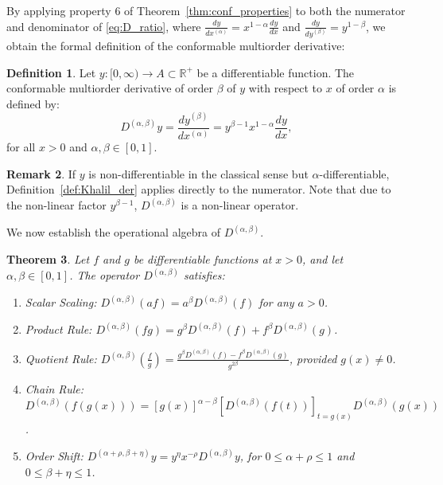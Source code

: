 \documentclass[oneside,10pt]{article}
\theoremstyle{plain}
\newtheorem{theorem}{Theorem}[section]
\theoremstyle{definition}
\newtheorem{definition}[theorem]{Definition}
\newtheorem{remark}[theorem]{Remark}
\begin{document}
By applying property 6 of Theorem~\ref{thm:conf_properties} to both the numerator and denominator of \eqref{eq:D_ratio}, where $\frac{dy}{dx^{(\alpha)}} = x^{1-\alpha} \frac{dy}{dx}$ and $\frac{dy}{dy^{(\beta)}} = y^{1-\beta}$, we obtain the formal definition of the conformable multiorder derivative:

\begin{definition}\label{def:multiorder_der}
Let $y: [0,\infty) \to A \subset \mathbb{R}^+$ be a differentiable function. The conformable multiorder derivative of order $\beta$ of $y$ with respect to $x$ of order $\alpha$ is defined by:
\begin{equation}\label{eq:multiorder_def_formula}
D^{(\alpha,\beta)} y = \frac{dy^{(\beta)}}{dx^{(\alpha)}} = y^{\beta-1} x^{1-\alpha} \frac{dy}{dx},
\end{equation}
for all $x > 0$ and $\alpha, \beta \in [0, 1]$.
\end{definition}

\begin{remark}
If $y$ is non-differentiable in the classical sense but $\alpha$-differentiable, Definition~\ref{def:Khalil_der} applies directly to the numerator. Note that due to the non-linear factor $y^{\beta-1}$, $D^{(\alpha,\beta)}$ is a non-linear operator.
\end{remark}

We now establish the operational algebra of $D^{(\alpha,\beta)}$.

\begin{theorem}\label{thm:multiorder_properties}
Let $f$ and $g$ be differentiable functions at $x > 0$, and let $\alpha, \beta \in [0, 1]$. The operator $D^{(\alpha,\beta)}$ satisfies:
\begin{enumerate}
    \item Scalar Scaling: $D^{(\alpha,\beta)}(a f) = a^\beta D^{(\alpha,\beta)}(f)$ for any $a > 0$.
    \item Product Rule: $D^{(\alpha,\beta)}(f g) = g^\beta D^{(\alpha,\beta)}(f) + f^\beta D^{(\alpha,\beta)}(g)$.
    \item Quotient Rule: $D^{(\alpha,\beta)}\left(\frac{f}{g}\right) = \frac{g^\beta D^{(\alpha,\beta)}(f) - f^\beta D^{(\alpha,\beta)}(g)}{g^{2\beta}}$, provided $g(x) \neq 0$.
    \item Chain Rule: $D^{(\alpha,\beta)}(f(g(x))) = [g(x)]^{\alpha-\beta} \left[ D^{(\alpha,\beta)}(f(t)) \right]_{t=g(x)} D^{(\alpha,\beta)}(g(x))$.
    \item Order Shift: $D^{(\alpha+\rho, \beta+\eta)} y = y^\eta x^{-\rho} D^{(\alpha,\beta)} y$, for $0 \le \alpha+\rho \le 1$ and $0 \le \beta+\eta \le 1$.
\end{enumerate}
\end{theorem}
\end{document}
